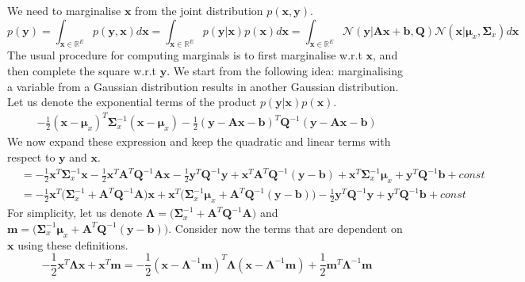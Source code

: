 \begin{enumerate}
We need to marginalise $\textbf{x}$ from the joint distribution $p(\textbf{x},\textbf{y})$.
\begin{equation}
p(\textbf{y}) = \int_{\textbf{x}\in\mathbb{R}^E} p(\textbf{y},\textbf{x})d\textbf{x} = \int_{\textbf{x}\in\mathbb{R}^E} p(\textbf{y}|\textbf{x}) p(\textbf{x})d\textbf{x} = \int_{\textbf{x}\in\mathbb{R}^E} \mathcal{N}(\textbf{y}| \textbf{A}\textbf{x} + \textbf{b}, \textbf{Q}) \mathcal{N}(\textbf{x}| \bm{\mu}_x, \bm{\Sigma}_x)d\textbf{x}
\end{equation}
The usual procedure for computing marginals is to first marginalise w.r.t $\textbf{x}$, and then complete the square w.r.t $\textbf{y}$. We start from the following idea: marginalising a variable from a Gaussian distribution results in another Gaussian distribution. Let us denote the exponential terms of the product $p(\textbf{y}|\textbf{x}) p(\textbf{x})$.
\begin{align*}
    -\frac{1}{2}(\textbf{x} - \bm{\mu}_x)^T\bm{\Sigma}_x^{-1}(\textbf{x} - \bm{\mu}_x) -\frac{1}{2}(\textbf{y} - \textbf{A}\textbf{x} - \textbf{b})^T\textbf{Q}^{-1}(\textbf{y} - \textbf{A}\textbf{x} - \textbf{b})
\end{align*}
We now expand these expression and keep the quadratic and linear terms with respect to $\textbf{y}$ and $\textbf{x}$.
\begin{align*}
&=-\frac{1}{2}\textbf{x}^T\bm{\Sigma}_x^{-1}\textbf{x} 
-\frac{1}{2}\textbf{x}^T\textbf{A}^T\textbf{Q}^{-1}\textbf{A}\textbf{x}
-\frac{1}{2}\textbf{y}^T\textbf{Q}^{-1}\textbf{y}
+ \textbf{x}^T\textbf{A}^T\textbf{Q}^{-1}(\textbf{y} - \textbf{b}) + \textbf{x}^T\bm{\Sigma}_x^{-1}\bm{\mu}_x + \textbf{y}^T\textbf{Q}^{-1}\textbf{b} + const\\
&=-\frac{1}{2}\textbf{x}^T\Big(\bm{\Sigma}_x^{-1} + \textbf{A}^T\textbf{Q}^{-1}\textbf{A}\Big)\textbf{x}  + \textbf{x}^T\Big(\bm{\Sigma}_x^{-1}\bm{\mu}_x + \textbf{A}^T\textbf{Q}^{-1}(\textbf{y} - \textbf{b})\Big) -\frac{1}{2}\textbf{y}^T\textbf{Q}^{-1}\textbf{y} + \textbf{y}^T\textbf{Q}^{-1}\textbf{b} + const
\end{align*}
For simplicity, let us denote $\bm{\Lambda} = (\bm{\Sigma}_x^{-1} + \textbf{A}^T\textbf{Q}^{-1}\textbf{A}\Big)$ and $\textbf{m} = \Big(\bm{\Sigma}_x^{-1}\bm{\mu}_x + \textbf{A}^T\textbf{Q}^{-1}(\textbf{y} - \textbf{b})\Big)$. Consider now the terms that are dependent on $\textbf{x}$ using these definitions.
\begin{equation}
-\frac{1}{2}\textbf{x}^T\bm{\Lambda}\textbf{x}  + \textbf{x}^T\textbf{m} = -\frac{1}{2}(\textbf{x} - \bm{\Lambda}^{-1}\textbf{m})^T\bm{\Lambda}(\textbf{x} - \bm{\Lambda}^{-1}\textbf{m})  + \frac{1}{2}\textbf{m}^T\bm{\Lambda}^{-1}\textbf{m}

\end{equation}
\end{enumerate}
